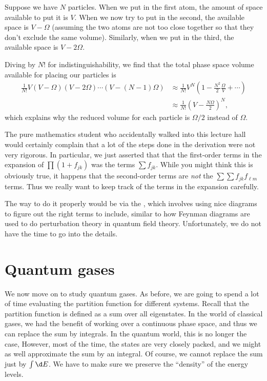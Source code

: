 \documentclass[a4paper]{article}
\begin{document}
Suppose we have $N$ particles. When we put in the first atom, the amount of space available to put it is $V$. When we now try to put in the second, the available space is $V - \Omega$ (assuming the two atoms are not too close together so that they don't exclude the same volume). Similarly, when we put in the third, the available space is $V - 2 \Omega$.

Diving by $N!$ for indistinguishability, we find that the total phase space volume available for placing our particles is
\begin{align*}
  \frac{1}{N!}V(V - \Omega) (V -2\Omega) \cdots (V - (N - 1) \Omega) &\approx \frac{1}{N!} V^N\left(1 - \frac{N^2}{2} \frac{\Omega}{V} + \cdots\right)\\
  &\approx \frac{1}{N!} \left(V - \frac{N\Omega}{2}\right)^N,
\end{align*}
which explains why the reduced volume for each particle is $\Omega/2$ instead of $\Omega$.

The pure mathematics student who accidentally walked into this lecture hall would certainly complain that a lot of the steps done in the derivation were not very rigorous. In particular, we just asserted that that the first-order terms in the expansion of $\prod (1 + f_{jk})$ was the terms $\sum f_{jk}$. While you might think this is obviously true, it happens that the second-order terms are \emph{not} the $\sum \sum f_{jk} f_{\ell m}$ terms. Thus we really want to keep track of the terms in the expansion carefully.

The way to do it properly would be via the , which involves using nice diagrams to figure out the right terms to include, similar to how Feynman diagrams are used to do perturbation theory in quantum field theory. Unfortunately, we do not have the time to go into the details.


\section{Quantum gases}
We now move on to study quantum gases. As before, we are going to spend a lot of time evaluating the partition function for different systems. Recall that the partition function is defined as a sum over all eigenstates. In the world of classical gases, we had the benefit of working over a continuous phase space, and thus we can replace the sum by integrals. In the quantum world, this is no longer the case, However, most of the time, the states are very closely packed, and we might as well approximate the sum by an integral. Of course, we cannot replace the sum just by $\int \d E$. We have to make sure we preserve the ``density'' of the energy levels.
\end{document}
